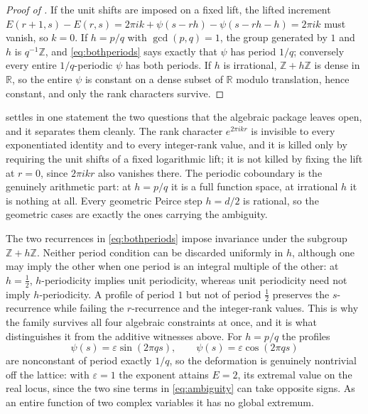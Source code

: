 \documentclass[11pt,letterpaper]{article}
\newcommand{\Zint}{\mathbb{Z}}
\newcommand{\Rr}{\mathbb{R}}
\begin{document}
\begin{proof}[Proof of ]
If the unit shifts are imposed on a fixed lift, the lifted increment
$E(r+1,s)-E(r,s)=2\pi ik+\psi(s-rh)-\psi(s-rh-h)=2\pi ik$ must vanish, so $k=0$.
If $h=p/q$ with $\gcd(p,q)=1$, the group generated by $1$ and $h$ is
$q^{-1}\Zint$, and \eqref{eq:bothperiods} says exactly that $\psi$ has period
$1/q$; conversely every entire $1/q$-periodic $\psi$ has both periods. If $h$ is
irrational, $\Zint+h\Zint$ is dense in $\Rr$, so the entire $\psi$ is constant on
a dense subset of $\Rr$ modulo translation, hence constant, and only the rank
characters survive.
\end{proof}

 settles in one statement the two questions that the
algebraic package leaves open, and it separates them cleanly. The rank character
$e^{2\pi ikr}$ is invisible to every exponentiated identity and to every
integer-rank value, and it is killed only by requiring the unit shifts of a fixed
logarithmic lift; it is not killed by fixing the lift at $r=0$, since $2\pi ikr$
also vanishes there. The periodic coboundary is the genuinely arithmetic part: at
$h=p/q$ it is a full function space, at irrational $h$ it is nothing at all. Every
geometric Peirce step $h=d/2$ is rational, so the geometric cases are exactly the
ones carrying the ambiguity.

The two recurrences in \eqref{eq:bothperiods} impose invariance under the
subgroup $\Zint+h\Zint$. Neither period condition can be discarded uniformly in
$h$, although one may imply the other when one period is an integral multiple of
the other: at $h=\tfrac12$, $h$-periodicity implies unit periodicity, whereas
unit periodicity need not imply $h$-periodicity. A profile of period $1$ but not
of period $\tfrac12$ preserves the $s$-recurrence while failing the
$r$-recurrence and the integer-rank values. This is why the family survives all
four algebraic constraints at once, and it is what distinguishes it from the
additive witnesses above. For $h=p/q$ the profiles
\begin{equation}
  \psi(s)=\varepsilon\sin(2\pi qs),
  \qquad
  \psi(s)=\varepsilon\cos(2\pi qs)
  \label{eq:profiles}
\end{equation}
are nonconstant of period exactly $1/q$, so the deformation is genuinely
nontrivial off the lattice: with $\varepsilon=1$ the exponent attains
$E=2$, its extremal value on the real locus, since the two sine terms in
\eqref{eq:ambiguity} can take opposite signs. As an entire function of two
complex variables it has no global extremum.
\end{document}
